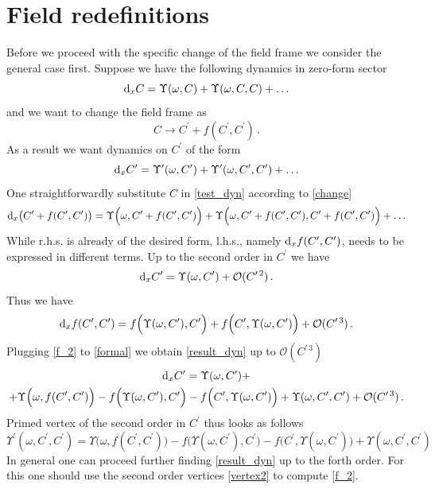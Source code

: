 \documentclass[12pt]{article}
\newcommand{\dr}{{{\rm d}}}
\newcommand{\go}{\omega}
\begin{document}
\section{Field redefinitions}\label{Field_redefinitions}
Before we proceed with the specific change of the field frame we consider the general case first. Suppose we have the following dynamics in zero-form sector
\begin{equation}\label{test_dyn}
\dr_x C=\Upsilon(\go,C)+\Upsilon(\go,C,C)+\ldots
\end{equation}
and we want to change the field frame as
\begin{equation}\label{change}
C\rightarrow C^\prime+f(C^\prime,C^\prime)\,.
\end{equation}
As a result we want dynamics on $C^\prime$ of the form
\begin{equation}\label{result_dyn}
\dr_x C^\prime=\Upsilon^\prime(\go,C^\prime)+\Upsilon^\prime(\go,C^\prime,C^\prime)+\ldots
\end{equation}
One straightforwardly substitute $C$ in \eqref{test_dyn} according to \eqref{change} 
\begin{equation}\label{formal}
\dr_x\big(C^\prime+f(C^\prime,C^\prime)\big)=\Upsilon\Big(\go,C^\prime+f(C^\prime,C^\prime)\Big)+\Upsilon\Big(\go,C^\prime+f(C^\prime,C^\prime),C^\prime+f(C^\prime,C^\prime)\Big)+\ldots
\end{equation}
While r.h.s. is already of the desired form, l.h.s., namely $\dr_x f(C^\prime,C^\prime)$, needs to be expressed in different terms.  Up to the second order in $C^\prime$ we have
\begin{equation}
\dr_x C^\prime=\Upsilon(\go,C^\prime)+\mathcal{O}(C^{\prime\, 2})\,.
\end{equation}
Thus we have
\begin{equation}\label{f_2}
\dr_x f(C^\prime,C^\prime)=f\Big(\Upsilon(\go,C^\prime),C^\prime\Big)+f\Big(C^\prime,\Upsilon(\go,C^\prime)\Big)+\mathcal{O}(C^{\prime\, 3})\,.
\end{equation}
Plugging \eqref{f_2} to \eqref{formal} we obtain \eqref{result_dyn} up to $\mathcal{O}(C^{\prime\, 3})$
\begin{multline}\label{result3}
\dr_x C^\prime=\Upsilon(\go,C^\prime)+\\
+\Upsilon\Big(\go,f(C^\prime,C^\prime)\Big)-f\Big(\Upsilon(\go,C^\prime),C^\prime\Big)-f\Big(C^\prime,\Upsilon(\go,C^\prime)\Big)+\Upsilon(\go,C^\prime,C^\prime)+\mathcal{O}(C^{\prime\, 3})\,.
\end{multline}
Primed vertex of the second order in $C^\prime$ thus looks as follows
\begin{equation}\label{vertex2}
\Upsilon^\prime(\go,C^\prime,C^\prime)=\Upsilon\Big(\go,f(C^\prime,C^\prime)\Big)-f\Big(\Upsilon(\go,C^\prime),C^\prime\Big)-f\Big(C^\prime,\Upsilon(\go,C^\prime)\Big)+\Upsilon(\go,C^\prime,C^\prime)
\end{equation}
In general one can proceed further finding \eqref{result_dyn} up to the forth order. For this one should use the second order vertices \eqref{vertex2} to compute \eqref{f_2}. 
\end{document}
